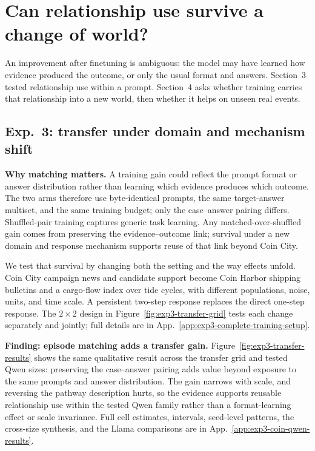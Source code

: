 \section{Can relationship use survive a change of world?}
\label{sec:transfer}

An improvement after finetuning is ambiguous: the model may have learned how
evidence produced the outcome, or only the usual format and answers. Section~3
tested relationship use within a prompt. Section~4 asks whether training carries
that relationship into a new world, then whether it helps on unseen real events.

\subsection{Exp.~3: transfer under domain and mechanism shift}
\label{sec:exp3}

\newcommand{\transfergridlines}{15}


\textbf{Why matching matters.}
A training gain could reflect the prompt format or answer distribution rather
than learning which evidence produces which outcome. The two arms therefore use
byte-identical prompts, the same target-answer multiset, and the same training
budget; only the case--answer pairing differs. Shuffled-pair training captures
generic task learning. Any matched-over-shuffled gain comes from preserving the
evidence--outcome link; survival under a new domain and response mechanism
supports reuse of that link beyond Coin City.

We test that survival by changing both the setting and the way effects unfold.
Coin City campaign news and candidate support become Coin Harbor shipping
bulletins and a cargo-flow index over tide cycles, with different populations,
noise, units, and time scale. A persistent two-step response replaces the
direct one-step response.
The $2\times2$ design in Figure~\ref{fig:exp3-transfer-grid} tests each change
separately and jointly; full details are in
App.~\ref{app:exp3-complete-training-setup}.

\begingroup
\makeatletter
{}
\makeatother

\endgroup

\noindent\textbf{Finding: episode matching adds a transfer gain.}
Figure~\ref{fig:exp3-transfer-results} shows the same qualitative result across
the transfer grid and tested Qwen sizes: preserving the case--answer pairing adds
value beyond exposure to the same prompts and answer distribution. The gain
narrows with scale, and reversing the pathway description hurts, so the evidence
supports reusable relationship use within the tested Qwen family rather than a
format-learning effect or scale invariance. Full cell estimates, intervals,
seed-level patterns, the cross-size synthesis, and the Llama comparisons are in
App.~\ref{app:exp3-coin-qwen-results}.

